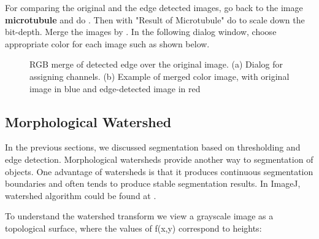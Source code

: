 \begin{indentexercise}{1}
For comparing the original and the edge detected images, go back to the
image \textbf{microtubule} and do
. Then with "Result of Microtubule" do  
to scale down the bit-depth. Merge the images by
.
In the following dialog window, choose appropriate color for each
image such as shown below. 

\begin{figure}[H]
\centering
{}
\caption{ RGB merge of detected edge over the original
image. (a) Dialog for assigning channels. (b) Example of merged color image, with original image in blue and edge-detected image in red}
\label{fig:EdgeDetectChannelMerging}
\end{figure} 

\end{indentexercise}

\subsection{Morphological Watershed }

In the previous sections, we discussed segmentation based on thresholding and edge detection. Morphological watersheds provide another way to segmentation of objects. One advantage of watersheds is that it produces continuous segmentation boundaries and often tends to produce stable segmentation results. In ImageJ, watershed algorithm could be found at .

To understand the watershed transform we view a grayscale image as a
topological surface, where the values of f(x,y) correspond to heights:

